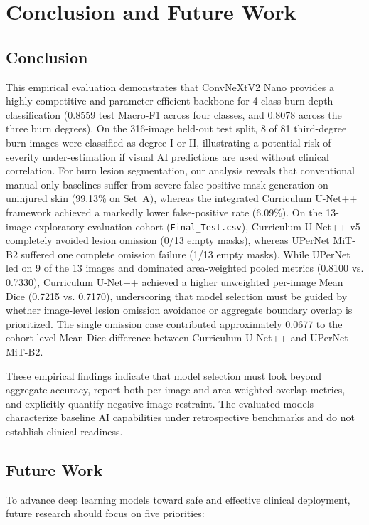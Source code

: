 \documentclass[11pt,a4paper]{article}
\begin{document}
\section{Conclusion and Future Work}

\subsection{Conclusion}

This empirical evaluation demonstrates that ConvNeXtV2 Nano provides a highly competitive and parameter-efficient backbone for 4-class burn depth classification (0.8559 test Macro-F1 across four classes, and 0.8078 across the three burn degrees). On the 316-image held-out test split, 8 of 81 third-degree burn images were classified as degree I or II, illustrating a potential risk of severity under-estimation if visual AI predictions are used without clinical correlation. For burn lesion segmentation, our analysis reveals that conventional manual-only baselines suffer from severe false-positive mask generation on uninjured skin (99.13\% on Set~A), whereas the integrated Curriculum U-Net++ framework achieved a markedly lower false-positive rate (6.09\%). On the 13-image exploratory evaluation cohort (\texttt{Final\_Test.csv}), Curriculum U-Net++ v5 completely avoided lesion omission (0/13 empty masks), whereas UPerNet MiT-B2 suffered one complete omission failure (1/13 empty masks). While UPerNet led on 9 of the 13 images and dominated area-weighted pooled metrics (0.8100 vs. 0.7330), Curriculum U-Net++ achieved a higher unweighted per-image Mean Dice (0.7215 vs. 0.7170), underscoring that model selection must be guided by whether image-level lesion omission avoidance or aggregate boundary overlap is prioritized. The single omission case contributed approximately 0.0677 to the cohort-level Mean Dice difference between Curriculum U-Net++ and UPerNet MiT-B2.

These empirical findings indicate that model selection must look beyond aggregate accuracy, report both per-image and area-weighted overlap metrics, and explicitly quantify negative-image restraint. The evaluated models characterize baseline AI capabilities under retrospective benchmarks and do not establish clinical readiness.

\subsection{Future Work}

To advance deep learning models toward safe and effective clinical deployment, future research should focus on five priorities:
\end{document}
